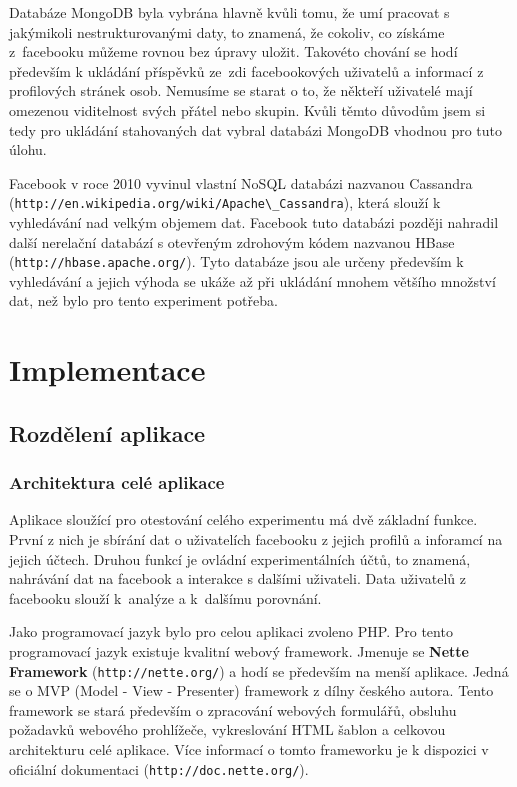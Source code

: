 \documentclass[thesis=M,czech]{FITthesis}[2013/05/10]
\begin{document}
Databáze MongoDB byla vybrána hlavně kvůli tomu, že umí pracovat s jakýmikoli nestrukturovanými daty, to znamená, že cokoliv, co získáme z~facebooku můžeme rovnou bez úpravy uložit. Takovéto chování se hodí především k ukládání příspěvků ze~zdi facebookových uživatelů a informací z profilových stránek osob. Nemusíme se starat o to, že někteří uživatelé mají omezenou viditelnost svých přátel nebo skupin. Kvůli těmto důvodům jsem si tedy pro ukládání stahovaných dat vybral databázi MongoDB vhodnou pro tuto úlohu.

Facebook v roce 2010 vyvinul vlastní NoSQL databázi nazvanou Cassandra (\verb|http://en.wikipedia.org/wiki/Apache\_Cassandra|), která slouží k vyhledávání nad velkým objemem dat. Facebook tuto databázi později nahradil další nerelační databází  s otevřeným zdrohovým kódem nazvanou HBase (\verb|http://hbase.apache.org/|). Tyto databáze jsou ale určeny především k vyhledávání a jejich výhoda se ukáže až při ukládání mnohem většího množství dat, než bylo pro tento experiment potřeba.





\chapter{Implementace}

\section{Rozdělení aplikace}

\subsection{Architektura celé aplikace}

Aplikace sloužící pro otestování celého experimentu má dvě základní funkce. První z nich je sbírání dat o uživatelích facebooku z jejich profilů a inforamcí na jejich účtech. Druhou funkcí je ovládní experimentálních účtů, to znamená, nahrávání dat na facebook a interakce s dalšími uživateli. Data uživatelů z facebooku slouží k~analýze a k~dalšímu porovnání.

Jako programovací jazyk bylo pro celou aplikaci zvoleno PHP. Pro tento programovací jazyk existuje kvalitní webový framework. Jmenuje se \textbf{Nette Framework} (\verb|http://nette.org/|) a hodí se především na menší aplikace. Jedná se o MVP (Model - View - Presenter) framework z dílny českého autora. Tento framework se stará především o zpracování webových formulářů, obsluhu požadavků webového prohlížeče, vykreslování HTML šablon a celkovou architekturu celé aplikace. Více informací o tomto frameworku je k dispozici v oficiální dokumentaci (\verb|http://doc.nette.org/|). 
\end{document}
